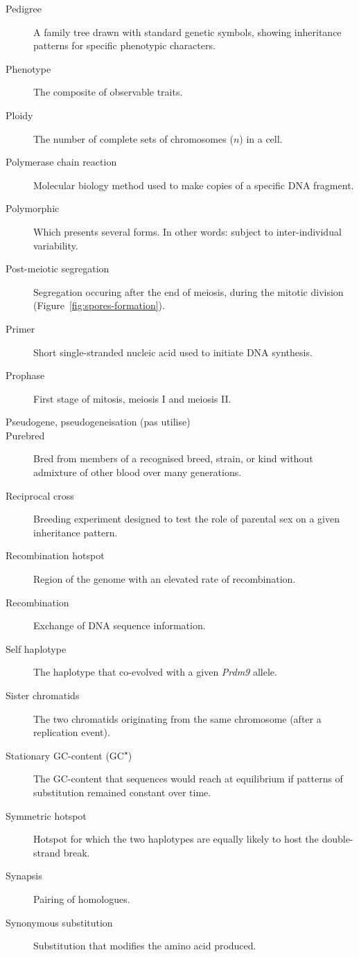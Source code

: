 \begin{alwayssingle}
\begin{description}
		\item[Pedigree] A family tree drawn with standard genetic symbols, showing inheritance patterns for specific phenotypic characters.
		\item[Phenotype] The composite of observable traits.
		\item[Ploidy] The number of complete sets of chromosomes ($n$) in a cell. 
		\item[Polymerase chain reaction] Molecular biology method used to make copies of a specific DNA fragment.
		\item[Polymorphic] Which presents several forms. In other words: subject to inter-individual variability.
		\item[Post-meiotic segregation] Segregation occuring after the end of meiosis, during the mitotic division (Figure~\ref{fig:spores-formation}).
		\item[Primer] Short single-stranded nucleic acid used to initiate DNA synthesis.
		\item[Prophase] First stage of mitosis, meiosis I and meiosis II\@.
		\item[Pseudogene, pseudogeneisation (pas utilise)]
		\item[Purebred] Bred from members of a recognised breed, strain, or kind without admixture of other blood over many generations.
		\item[Reciprocal cross] Breeding experiment designed to test the role of parental sex on a given inheritance pattern.
		\item[Recombination hotspot] Region of the genome with an elevated rate of recombination.
		\item[Recombination] Exchange of DNA sequence information.
		\item[Self haplotype] The haplotype that co-evolved with a given \textit{Prdm9} allele.
		\item[Sister chromatids] The two chromatids originating from the same chromosome (after a replication event).
		\item[Stationary GC-content (GC\textsuperscript{$\star$})] The GC-content that sequences would reach at equilibrium if patterns of substitution remained constant over time.
		\item[Symmetric hotspot] Hotspot for which the two haplotypes are equally likely to host the double-strand break.
		\item[Synapsis] Pairing of homologues.
		\item[Synonymous substitution] Substitution that modifies the amino acid produced.

\end{description}
\end{alwayssingle}
